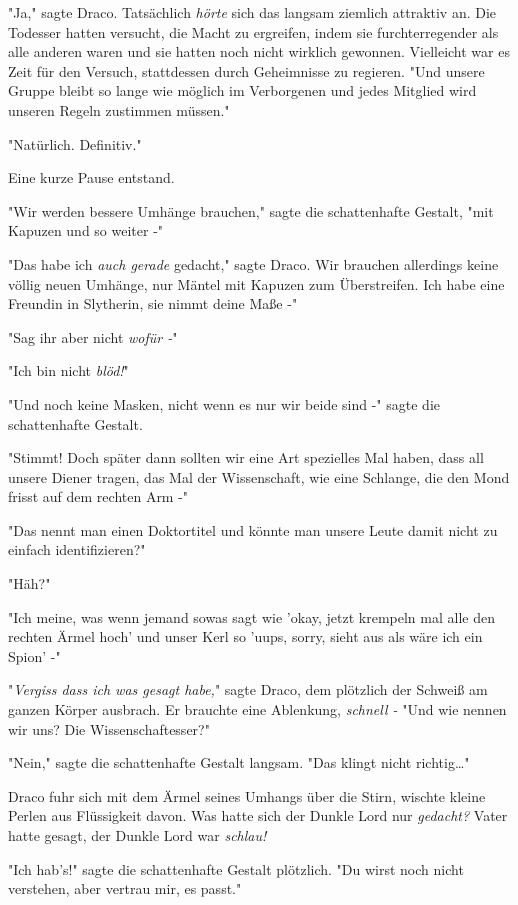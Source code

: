 {"Ja," sagte Draco. Tatsächlich \emph{hörte} sich das langsam ziemlich attraktiv an. Die Todesser hatten versucht, die Macht zu ergreifen, indem sie furchterregender als alle anderen waren und sie hatten noch nicht wirklich gewonnen. Vielleicht war es Zeit für den Versuch, stattdessen durch Geheimnisse zu regieren. "Und unsere Gruppe bleibt so lange wie möglich im Verborgenen und jedes Mitglied wird unseren Regeln zustimmen müssen."

"Natürlich. Definitiv."

Eine kurze Pause entstand.

"Wir werden bessere Umhänge brauchen," sagte die schattenhafte Gestalt, "mit Kapuzen und so weiter -"

"Das habe ich \emph{auch gerade} gedacht," sagte Draco. Wir brauchen allerdings keine völlig neuen Umhänge, nur Mäntel mit Kapuzen zum Überstreifen. Ich habe eine Freundin in Slytherin, sie nimmt deine Maße -"

"Sag ihr aber nicht \emph{wofür -}"

"Ich bin nicht \emph{blöd!}"

"Und noch keine Masken, nicht wenn es nur wir beide sind -" sagte die schattenhafte Gestalt.

"Stimmt! Doch später dann sollten wir eine Art spezielles Mal haben, dass all unsere Diener tragen, das Mal der Wissenschaft, wie eine Schlange, die den Mond frisst auf dem rechten Arm -"

"Das nennt man einen Doktortitel und könnte man unsere Leute damit nicht zu einfach identifizieren?"

"Häh?"

"Ich meine, was wenn jemand sowas sagt wie 'okay, jetzt krempeln mal alle den rechten Ärmel hoch' und unser Kerl so 'uups, sorry, sieht aus als wäre ich ein Spion' -"

"\emph{Vergiss dass ich was gesagt habe,}" sagte Draco, dem plötzlich der Schweiß am ganzen Körper ausbrach. Er brauchte eine Ablenkung, \emph{schnell -} "Und wie nennen wir uns? Die Wissenschaftesser?"

"Nein," sagte die schattenhafte Gestalt langsam. "Das klingt nicht richtig…"

Draco fuhr sich mit dem Ärmel seines Umhangs über die Stirn, wischte kleine Perlen aus Flüssigkeit davon. Was hatte sich der Dunkle Lord nur \emph{gedacht?} Vater hatte gesagt, der Dunkle Lord war \emph{schlau!}

"Ich hab's!" sagte die schattenhafte Gestalt plötzlich. "Du wirst noch nicht verstehen, aber vertrau mir, es passt."

}
